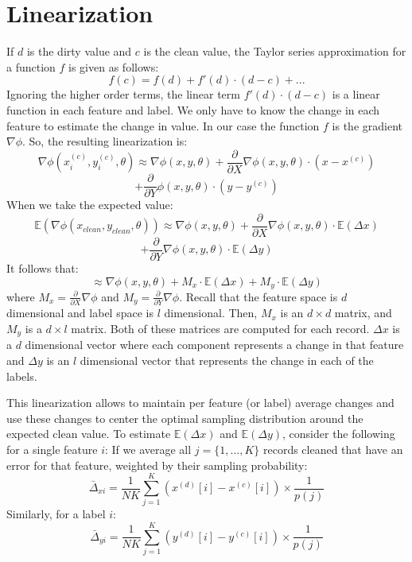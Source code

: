 \section{Linearization}\label{apptaylor}
If $d$ is the dirty value and $c$ is the clean value, the Taylor series approximation for a function $f$ is given as follows:
\[
f(c) = f(d) + f'(d)\cdot(d-c) + ...
\]
Ignoring the higher order terms, the linear term $f'(d)\cdot(d-c)$ is a linear function in each feature and label.
We only have to know the change in each feature to estimate the change in value.
In our case the function $f$ is the gradient $\nabla\phi$.
So, the resulting linearization is:
\[
\nabla\phi(x^{(c)}_i,y^{(c)}_i,\theta) \approx \nabla\phi(x,y,\theta) + \frac{\partial}{\partial X}\nabla\phi(x,y,\theta)\cdot (x - x^{(c)}) \]
\[+ \frac{\partial}{\partial Y}\phi(x,y,\theta)\cdot (y - y^{(c)})
\]
When we take the expected value:
\[
\mathbb{E}(\nabla\phi(x_{clean},y_{clean},\theta)) \approx \nabla\phi(x,y,\theta) + \frac{\partial}{\partial X}\nabla\phi(x,y,\theta)\cdot \mathbb{E}(\Delta x) \]
\[+ \frac{\partial}{\partial Y}\nabla\phi(x,y,\theta)\cdot \mathbb{E}(\Delta y)
\]
It follows that:
\[
\approx \nabla\phi(x,y,\theta) + M_x \cdot \mathbb{E}(\Delta x) + M_y \cdot \mathbb{E}(\Delta y)
\]
where $M_x = \frac{\partial}{\partial X}\nabla\phi$ and $M_y = \frac{\partial}{\partial Y}\nabla\phi$.
Recall that the feature space is $d$ dimensional and label space is $l$ dimensional.
Then, $M_x$ is an $d \times d$ matrix, and $M_y$ is a $d \times l$ matrix.
Both of these matrices are computed for each record.
$\Delta x$ is a $d$ dimensional vector where each component represents a change in that feature and $\Delta y$ is an $l$ dimensional vector that represents the change in each of the labels. 

This linearization allows \sys to maintain per feature (or label) average changes and use these changes to center the optimal sampling distribution around the expected clean value.
To estimate $\mathbb{E}(\Delta x)$ and $\mathbb{E}(\Delta y)$, consider the following for a single feature $i$:
If we average all $j=\{1,...,K\}$ records cleaned that have an error for that feature, weighted by their sampling probability:
\[
\bar{\Delta}_{xi} = \frac{1}{NK}\sum_{j=1}^K (x^{(d)}[i]-x^{(c)}[i])\times \frac{1}{p(j)}
\]
Similarly, for a label $i$:
\[
\bar{\Delta}_{yi} = \frac{1}{NK}\sum_{j=1}^K (y^{(d)}[i]-y^{(c)}[i])\times \frac{1}{p(j)}
\]

